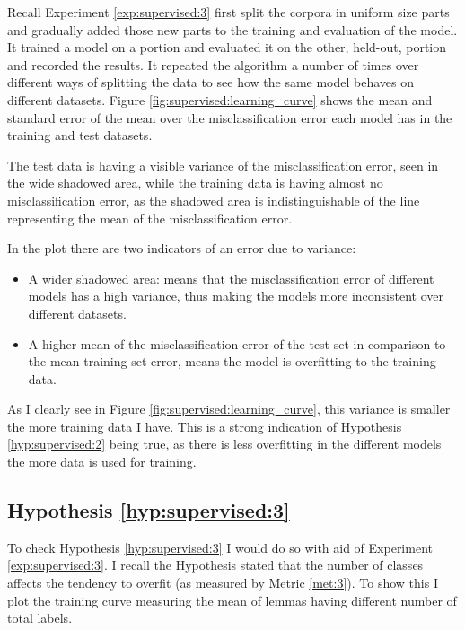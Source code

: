 Recall Experiment \ref{exp:supervised:3} first split the corpora in uniform
size parts and gradually added those new parts to the training and evaluation
of the model. It trained a model on a portion and evaluated it on the other,
held-out, portion and recorded the results. It repeated the algorithm a number
of times over different ways of splitting the data to see how the same model
behaves on different datasets. Figure \ref{fig:supervised:learning_curve}
shows the mean and standard error of the mean over the misclassification error
each model has in the training and test datasets.

The test data is having a visible variance of the misclassification error, seen
in the wide shadowed area, while the training data is having almost no
misclassification error, as the shadowed area is indistinguishable of the line
representing the mean of the misclassification error.

In the plot there are two indicators of an error due to variance:

\begin{itemize}
  \item A wider shadowed area: means that the misclassification error of
    different models has a high variance, thus making the models more
    inconsistent over different datasets.
  \item A higher mean of the misclassification error of the test set in
    comparison to the mean training set error, means the model is overfitting
    to the training data.
\end{itemize}

As I clearly see in Figure \ref{fig:supervised:learning_curve}, this variance
is smaller the more training data I have. This is a strong indication of
Hypothesis \ref{hyp:supervised:2} being true, as there is less overfitting in
the different models the more data is used for training.

\subsection{Hypothesis \ref{hyp:supervised:3}}\label{sec:supervised:hyp:3}

To check Hypothesis \ref{hyp:supervised:3} I would do so with aid of
Experiment \ref{exp:supervised:3}. I recall the Hypothesis stated that the
number of classes affects the tendency to overfit (as measured by Metric
\ref{met:3}). To show this I plot the training curve measuring the
mean of lemmas having different number of total labels.

